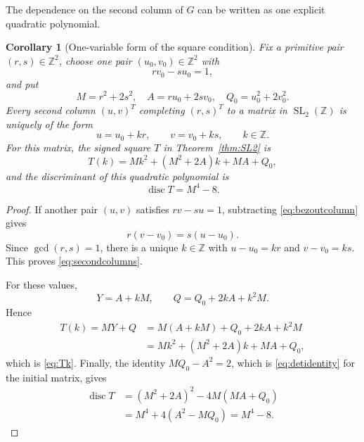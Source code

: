 \documentclass[11pt,a4paper]{amsart}
\numberwithin{equation}{section}
\newtheorem{corollary}[theorem]{Corollary}
\theoremstyle{definition}
\newcommand{\Z}{\mathbb Z}
\newcommand{\SL}{\operatorname{SL}}
\begin{document}
The dependence on the second column of \(G\) can be written as one
explicit quadratic polynomial.

\begin{corollary}[One-variable form of the square condition]
\label{cor:Tk}
Fix a primitive pair \((r,s)\in\Z^2\), choose one pair
\((u_0,v_0)\in\Z^2\) with
\begin{equation}
 rv_0-su_0=1,
 \label{eq:bezoutcolumn}
\end{equation}
and put
\begin{equation}
 M=r^2+2s^2,
 \quad A=ru_0+2sv_0,
 \quad Q_0=u_0^2+2v_0^2.
 \label{eq:MAQ0}
\end{equation}
Every second column \((u,v)^T\) completing \((r,s)^T\) to a matrix in
\(\SL_2(\Z)\) is uniquely of the form
\begin{equation}
 u=u_0+kr,
 \qquad v=v_0+ks,
 \qquad k\in\Z.
 \label{eq:secondcolumns}
\end{equation}
For this matrix, the signed square \(T\) in
Theorem~\ref{thm:SL2} is
\begin{equation}
 T(k)=Mk^2+(M^2+2A)k+MA+Q_0,
 \label{eq:Tk}
\end{equation}
and the discriminant of this quadratic polynomial is
\begin{equation}
 \operatorname{disc}T=M^4-8.
 \label{eq:Tkdisc}
\end{equation}
\end{corollary}

\begin{proof}
If another pair \((u,v)\) satisfies \(rv-su=1\), subtracting
\eqref{eq:bezoutcolumn} gives
\begin{equation*}
 r(v-v_0)=s(u-u_0).
\end{equation*}
Since \(\gcd(r,s)=1\), there is a unique \(k\in\Z\) with
\(u-u_0=kr\) and \(v-v_0=ks\).  This proves
\eqref{eq:secondcolumns}.

For these values,
\begin{equation*}
 Y=A+kM,
 \qquad Q=Q_0+2kA+k^2M.
\end{equation*}
Hence
\begin{align*}
 T(k)=MY+Q
 &=M(A+kM)+Q_0+2kA+k^2M\\
 &=Mk^2+(M^2+2A)k+MA+Q_0,
\end{align*}
which is \eqref{eq:Tk}.  Finally, the identity
\(MQ_0-A^2=2\), which is \eqref{eq:detidentity} for the initial
matrix, gives
\begin{align*}
 \operatorname{disc}T
 &=(M^2+2A)^2-4M(MA+Q_0)\\
 &=M^4+4(A^2-MQ_0)=M^4-8.
\end{align*}
\end{proof}
\end{document}
